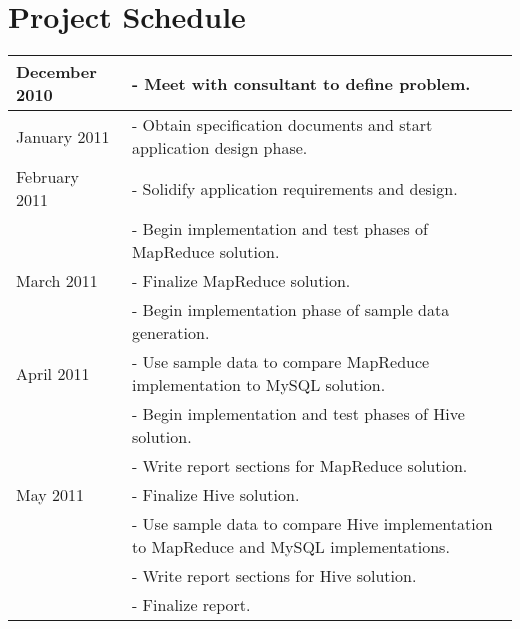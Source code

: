 \documentclass[letterpaper,12pt,titlepage]{article}
\begin{document}
\section{Project Schedule}
\begin{center}
\begin{tabular}{ | l || p{4.50in} | }\hline
 December 2010 & - Meet with consultant to define problem.\\\hline
  January 2011 & - Obtain specification documents and start application design
		 phase.\\\hline
 February 2011 & - Solidify application requirements and design.\\
        \hfill & - Begin implementation and test phases of MapReduce
                 solution.\\\hline
    March 2011 & - Finalize MapReduce solution.\\
        \hfill & - Begin implementation phase of sample data generation.\\\hline
    April 2011 & - Use sample data to compare MapReduce implementation to MySQL
		             solution.\\
        \hfill & - Begin implementation and test phases of Hive solution.\\
        \hfill &-  Write report sections for MapReduce solution.\\\hline
      May 2011 & - Finalize Hive solution.\\
        \hfill & - Use sample data to compare Hive implementation to MapReduce	
		             and MySQL implementations.\\
        \hfill & - Write report sections for Hive solution.\\
        \hfill & - Finalize report.\\\hline
\end{tabular}
  
\end{center}


\pagebreak
\begin{singlespace}


\pagebreak
\end{singlespace}
\end{document}
